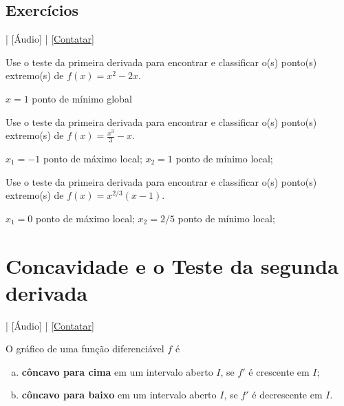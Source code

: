 \subsection*{Exercícios}

\begin{flushright}
  [Vídeo] | [Áudio] | \href{https://phkonzen.github.io/notas/contato.html}{[Contatar]}
\end{flushright}

\begin{exer}
  Use o teste da primeira derivada para encontrar e classificar o(s) ponto(s) extremo(s) de $f(x) = x^2 - 2x$.
\end{exer}
\begin{resp}
  $x=1$ ponto de mínimo global
\end{resp}

\begin{exer}
    Use o teste da primeira derivada para encontrar e classificar o(s) ponto(s) extremo(s) de $\displaystyle f(x) = \frac{x^3}{3}-x$.
\end{exer}
\begin{resp}
  $x_1=-1$ ponto de máximo local; $x_2=1$ ponto de mínimo local;
\end{resp}

\begin{exer}
  Use o teste da primeira derivada para encontrar e classificar o(s) ponto(s) extremo(s) de $\displaystyle f(x) = x^{2/3}(x-1)$.
\end{exer}
\begin{resp}
  $x_1=0$ ponto de máximo local; $x_2=2/5$ ponto de mínimo local;
\end{resp}


\section{Concavidade e o Teste da segunda derivada}\label{cap_apderiv_sec_tder2}

\begin{flushright}
  [Vídeo] | [Áudio] | \href{https://phkonzen.github.io/notas/contato.html}{[Contatar]}
\end{flushright}

O gráfico de uma função diferenciável $f$ é
\begin{enumerate}[a)]
\item {\bf côncavo para cima} em um intervalo aberto $I$, se $f'$ é crescente em $I$;
\item {\bf côncavo para baixo} em um intervalo aberto $I$, se $f'$ é decrescente em $I$.
\end{enumerate}

